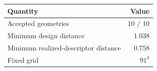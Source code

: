 \begin{tabular}{lr}
\toprule
Quantity & Value \\
\midrule
Accepted geometries & 10 / 10 \\ 
Minimum design distance & 1.038 \\ 
Minimum realized-descriptor distance & 0.758 \\ 
Fixed grid & $91^3$ \\
\bottomrule
\end{tabular}
